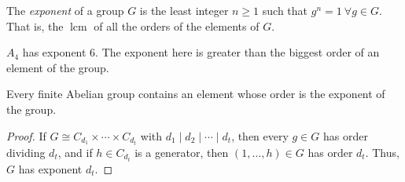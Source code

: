 \begin{definition}
    The \textit{exponent} of a group \(G\) is the least integer \(n \geq 1\) such that \(g^n = 1 ~ \forall g\in G\). That is, the \(\operatorname{lcm}\) of all the orders of the elements of \(G\).
\end{definition}
\begin{example}
    \(A_4\) has exponent 6. The exponent here is greater than the biggest order of an element of the group.
\end{example}
\begin{corollary}
    Every finite Abelian group contains an element whose order is the exponent of the group.
\end{corollary}
\begin{proof}
    If \(G \cong C_{d_1} \times \cdots \times C_{d_t}\) with \(d_1 \mid d_2 \mid \cdots \mid d_t\), then every \(g \in G\) has order dividing \(d_t\), and if \(h \in C_{d_t}\) is a generator, then \((1, \ldots, h)\in G\) has order \(d_t\). Thus, \(G\) has exponent \(d_t\).
\end{proof}